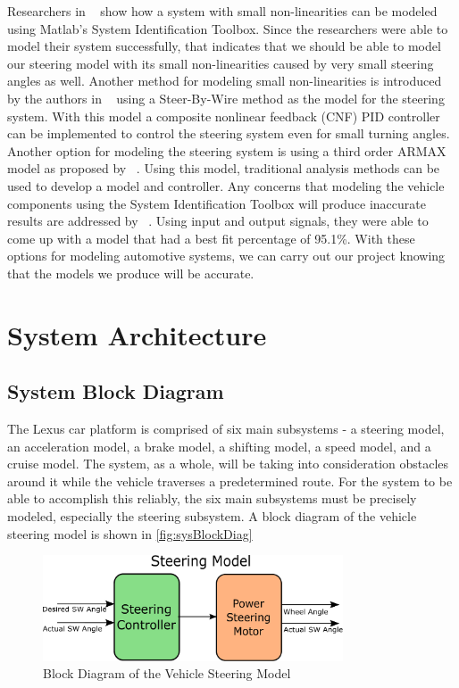 \documentclass[12pt]{article} %
\begin{document}
Researchers in ~\cite{Adnan2010} show how a system with small non-linearities can be modeled using Matlab's System Identification Toolbox. Since the researchers were able to model their system successfully, that indicates that we should be able to model our steering model with its small non-linearities caused by very small steering angles as well. Another method for modeling small non-linearities is introduced by the authors in ~\cite{Saruchi2015} using a Steer-By-Wire method as the model for the steering system. With this model a composite nonlinear feedback (CNF) PID controller can be implemented to control the steering system even for small turning angles. Another option for modeling the steering system is using a third order ARMAX model as proposed by ~\cite{Li1999}. Using this model, traditional analysis methods can be used to develop a model and controller. Any concerns that modeling the vehicle components using the System Identification Toolbox will produce inaccurate results are addressed by ~\cite{Donjaroennon2021}. Using input and output signals, they were able to come up with a model that had a best fit percentage of 95.1\%. With these options for modeling automotive systems, we can carry out our project knowing that the models we produce will be accurate. 

\section{System Architecture}
\subsection{System Block Diagram}
The Lexus car platform is comprised of six main subsystems - a steering model, an acceleration model, a brake model, a shifting model, a speed model, and a cruise model. The system, as a whole, will be taking into consideration obstacles around it while the vehicle traverses a predetermined route. For the system to be able to accomplish this reliably, the six main subsystems must be precisely modeled, especially the steering subsystem. A block diagram of the vehicle steering model is shown in \autoref{fig:sysBlockDiag}
\begin{figure}[h]
    \centering
    \captionsetup{justification=centering, margin=3cm}
    \includegraphics[width=3.5in]{figs/inkscape/steeringModelArchitecture}
    \caption{Block Diagram of the Vehicle Steering Model}
    \label{fig:sysBlockDiag}
\end{figure}
\end{document}
